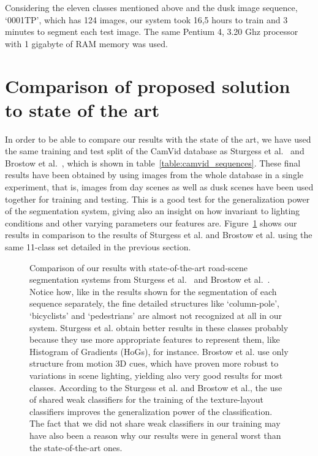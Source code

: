 Considering the eleven classes mentioned above and the dusk image sequence, `0001TP', which has 124 images, our system took 16,5 hours to train and 3 minutes to segment each test image. The same Pentium 4, 3.20 Ghz processor with 1 gigabyte of RAM memory was used.

\section{Comparison of proposed solution to state of the art}

In order to be able to compare our results with the state of the art, we have used the same training and test split of the CamVid database as Sturgess et al.~\cite{sturgess:road_scene} and Brostow et al.~\cite{brostow:structure_from_motion}, which is shown in table~\ref{table:camvid_sequences}. These final results have been obtained by using images from the whole database in a single experiment, that is, images from day scenes as well as dusk scenes have been used together for training and testing. This is a good test for the generalization power of the segmentation system, giving also an insight on how invariant to lighting conditions and other varying parameters our features are. Figure~\ref{fig:comparison_to_state_of_the_art} shows our results in comparison to the results of Sturgess et al. and Brostow et al. using the same 11-class set detailed in the previous section.

\begin{figure}[htb]
\caption[Comparison to state of the art]{Comparison of our results with state-of-the-art road-scene segmentation systems from Sturgess et al.~\cite{sturgess:road_scene} and Brostow et al.~\cite{brostow:structure_from_motion}. Notice how, like in the results shown for the segmentation of each sequence separately, the fine detailed structures like `column-pole', `bicyclists' and `pedestrians' are almost not recognized at all in our system. Sturgess et al. obtain better results in these classes probably because they use more appropriate features to represent them, like Histogram of Gradients (HoGs), for instance. Brostow et al. use only structure from motion 3D cues, which have proven more robust to variations in scene lighting, yielding also very good results for most classes. According to the Sturgess et al. and Brostow et al., the use of shared weak classifiers for the training of the texture-layout classifiers improves the generalization power of the classification. The fact that we did not share weak classifiers in our training may have also been a reason why our results were in general worst than the state-of-the-art ones.}
\label{fig:comparison_to_state_of_the_art}
\end{figure}

